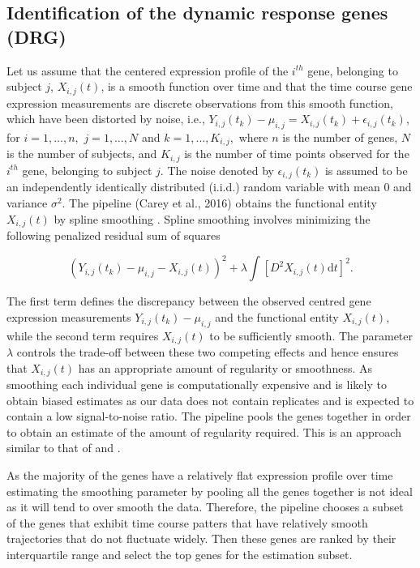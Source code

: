 \subsection{Identification of the dynamic response genes (DRG)}
\label{section:identification_of_drgs}

Let us assume that the centered expression profile of the $i^{th}$ gene, belonging to subject $j$, $X_{i,j}(t)$, is a smooth function over time and that the time course gene expression measurements are discrete observations from this smooth function, which have been distorted by noise, i.e., $Y_{i,j}(t_{k}) -\mu_{i,j} =X_{i,j}(t_{k})+\epsilon_{i,j}(t_{k})$, for $i=1,\ldots,n,$ $j=1,\ldots,N$ and $k=1,\ldots,K_{i,j},$ where $n$ is the number of genes, $N$ is the number of subjects, and $K_{i,j}$ is the number of time points observed for the $i^{th}$ gene, belonging to subject $j$. The noise denoted by $\epsilon_{i,j}(t_{k})$ is assumed to be an independently identically distributed (i.i.d.) random variable with mean $0$ and variance $\sigma^{2}$. The pipeline (Carey et al., 2016) obtains the functional entity $X_{i,j}(t)$ by spline smoothing \citep{green1993nonparametric,silverman2005functional}. Spline smoothing involves minimizing the following penalized residual sum of squares 

\begin{equation}
\label{eq:res_sum_squares}
(Y_{i,j}(t_{k}) -\mu_{i,j} - X_{i,j}(t))^{2} + \lambda \int \left[D^{2} X_{i,j}(t) \textrm{d}t\right]^{2}.
\end{equation}

The first term defines the discrepancy between the observed centred gene expression measurements $Y_{i,j}(t_{k}) -\mu_{i,j}$ and the functional entity $X_{i,j}(t),$ while the second term requires $X_{i,j}(t)$ to be sufficiently smooth. The parameter $\lambda$ controls the trade-off between these two competing effects and hence ensures that $X_{i,j}(t)$ has an appropriate amount of regularity or smoothness. As smoothing each individual gene is computationally expensive and is likely to obtain biased estimates as our data does not contain replicates and is expected to contain a low signal-to-noise ratio. The pipeline pools the genes together in order to obtain an estimate of the amount of regularity required. This is an approach similar to that of \cite{yao2005functional} and \cite{wu2013more}.

As the majority of the genes have a relatively flat expression profile over time estimating the smoothing parameter by pooling all the genes together is not ideal as it will tend to over smooth the data. Therefore, the pipeline chooses a subset of the genes that exhibit time course patters that have relatively smooth trajectories that do not fluctuate widely. Then these genes are ranked by their interquartile range and select the top genes for the estimation subset.

